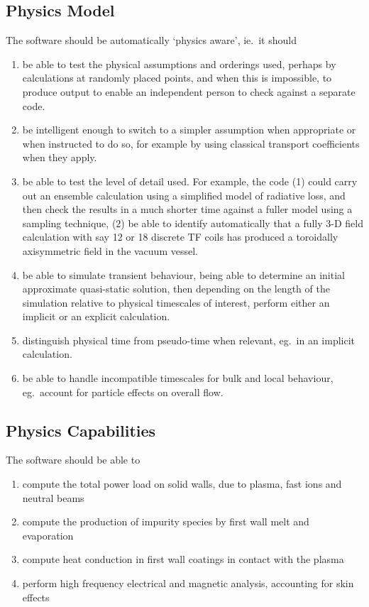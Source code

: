 \clearpage
\subsection{Physics Model}\label{sec:RB2_physmod}
The software should be automatically `physics aware', ie.\ it should
\begin{enumerate}
\item be able to test the physical assumptions and orderings used, perhaps by calculations at randomly placed points, and
when this is impossible, to
produce output to enable an independent person to check against a separate code.
\item be intelligent enough to switch to a simpler assumption
when appropriate or when instructed to do so, for example by using classical
transport coefficients when they apply.
\item be able to test the level of detail used.  For example, the code  (1) 
could carry out an ensemble calculation using a simplified model of radiative loss,
and then check the results in a much shorter time against a fuller model using
a sampling technique, (2)  be able to identify
automatically that a fully 3-D field calculation with say 12 or 18 discrete TF
coils has produced a toroidally axisymmetric field in the vacuum vessel.
\item be able to simulate transient behaviour, being able to determine an initial approximate quasi-static solution, then
depending on the length of the simulation relative to physical timescales of interest, perform
either an implicit or an explicit calculation.
\item distinguish physical time from pseudo-time when relevant, eg.\ in an implicit calculation.
\item be able to handle incompatible timescales for bulk and local behaviour, eg.\ account for particle effects on overall flow.
\end{enumerate}
\clearpage
\subsection{Physics Capabilities}\label{sec:RB2_physcap}
The software should be able to 
\begin{enumerate}
\item compute the total power load on solid walls, due to plasma, fast ions and neutral beams
\item compute the production of impurity species by first wall melt and evaporation
\item compute heat conduction in first wall coatings in contact with the plasma
\item perform high frequency electrical and magnetic analysis, accounting for skin effects
\end{enumerate}

